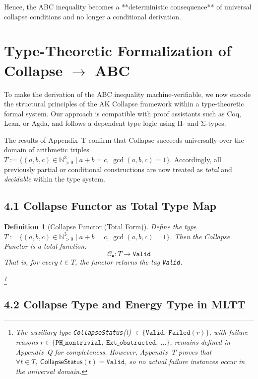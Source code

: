 \documentclass[11pt]{article}
\newtheorem{definition}[theorem]{Definition}
\begin{document}
Hence, the ABC inequality becomes a **deterministic consequence** of universal collapse conditions and no longer a conditional derivation.




\section{Type-Theoretic Formalization of Collapse \texorpdfstring{$\to$}{→} ABC}

To make the derivation of the ABC inequality machine-verifiable, we now encode the structural principles of the AK Collapse framework within a type-theoretic formal system. Our approach is compatible with proof assistants such as Coq, Lean, or Agda, and follows a dependent type logic using Π- and Σ-types.

The results of Appendix~T confirm that Collapse succeeds universally over the domain of arithmetic triples \( T := \{ (a,b,c) \in \mathbb{N}_{>0}^3 \mid a + b = c,\ \gcd(a,b,c) = 1 \} \).  
Accordingly, all previously partial or conditional constructions are now treated as \emph{total} and \emph{decidable} within the type system.

\subsection{4.1 Collapse Functor as Total Type Map}

\begin{definition}[Collapse Functor (Total Form)]
Define the type \( T := \{ (a,b,c) \in \mathbb{N}_{>0}^3 \mid a + b = c,\ \gcd(a,b,c) = 1 \} \).  
Then the \emph{Collapse Functor} is a total function:
\[
\mathcal{C}_\bullet : T \longrightarrow \texttt{Valid}
\]
That is, for every \( t \in T \), the functor returns the tag \texttt{Valid}.

\footnote{
The auxiliary type \texttt{CollapseStatus}(t) \(\in \{ \texttt{Valid},\ \texttt{Failed}(r) \}\),  
with failure reasons \( r \in \{\texttt{PH\_nontrivial},\ \texttt{Ext\_obstructed},\ \ldots \} \), remains defined in Appendix~Q for completeness.  
However, Appendix~T proves that \( \forall t \in T,\ \mathsf{CollapseStatus}(t) = \texttt{Valid} \),  
so no actual failure instances occur in the universal domain.
}
\end{definition}

\subsection{4.2 Collapse Type and Energy Type in MLTT}
\end{document}
